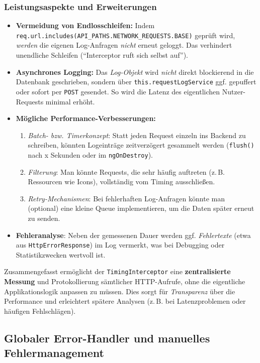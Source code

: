\documentclass[12pt,oneside]{article}
\begin{document}
\subsubsection{Leistungsaspekte und Erweiterungen}
\begin{itemize}
  \item \textbf{Vermeidung von Endlosschleifen:} Indem \lstinline|req.url.includes(API_PATHS.NETWORK_REQUESTS.BASE)| geprüft wird, \emph{werden} die eigenen Log-Anfragen \emph{nicht} erneut geloggt. Das verhindert unendliche Schleifen (\enquote{Interceptor ruft sich selbst auf}).
  \item \textbf{Asynchrones Logging:} Das \emph{Log-Objekt} wird \emph{nicht} direkt blockierend in die Datenbank geschrieben, sondern über \lstinline|this.requestLogService| ggf. gepuffert oder sofort per \lstinline|POST| gesendet. So wird die Latenz des eigentlichen Nutzer-Requests minimal erhöht.
  \item \textbf{Mögliche Performance-Verbesserungen:} 
    \begin{enumerate}
      \item \emph{Batch- bzw. Timerkonzept}: Statt jeden Request einzeln ins Backend zu schreiben, könnten Logeinträge zeitverzögert gesammelt werden (\lstinline|flush()| nach x Sekunden oder im \lstinline|ngOnDestroy|).
      \item \emph{Filterung}: Man könnte Requests, die sehr häufig auftreten (z.\,B. Ressourcen wie Icons), vollständig vom Timing ausschließen.
      \item \emph{Retry-Mechanismen}: Bei fehlerhaften Log-Anfragen könnte man (optional) eine kleine Queue implementieren, um die Daten später erneut zu senden.
    \end{enumerate}
  \item \textbf{Fehleranalyse}: Neben der gemessenen Dauer werden ggf. \emph{Fehlertexte} (etwa aus \lstinline|HttpErrorResponse|) im Log vermerkt, was bei Debugging oder Statistikzwecken wertvoll ist.
\end{itemize}

Zusammengefasst ermöglicht der \lstinline|TimingInterceptor| eine \textbf{zentralisierte Messung} und Protokollierung sämtlicher HTTP-Aufrufe, ohne die eigentliche Applikationslogik anpassen zu müssen. Dies sorgt für \emph{Transparenz} über die Performance und erleichtert spätere Analysen (z.\,B. bei Latenzproblemen oder häufigen Fehlschlägen).

\subsection{Globaler Error-Handler und manuelles Fehlermanagement}
\label{subsec:global_error_handling}
\end{document}
